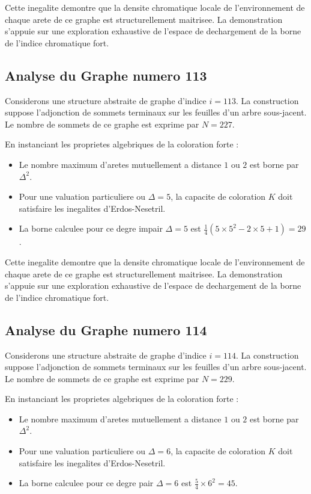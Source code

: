 \documentclass[11pt,a4paper]{article}
\begin{document}
Cette inegalite demontre que la densite chromatique locale de l'environnement de chaque arete de ce graphe est structurellement maitrisee. La demonstration s'appuie sur une exploration exhaustive de l'espace de dechargement de la borne de l'indice chromatique fort.

\subsection{Analyse du Graphe numero 113}
Considerons une structure abstraite de graphe d'indice $i = 113$. La construction suppose l'adjonction de sommets terminaux sur les feuilles d'un arbre sous-jacent. Le nombre de sommets de ce graphe est exprime par $N = 227$.

En instanciant les proprietes algebriques de la coloration forte :
\begin{itemize}
\item Le nombre maximum d'aretes mutuellement a distance $1$ ou $2$ est borne par $\Delta^2$.
\item Pour une valuation particuliere ou $\Delta = 5$, la capacite de coloration $K$ doit satisfaire les inegalites d'Erdos-Nesetril.
\item La borne calculee pour ce degre impair $\Delta = 5$ est $\frac{1}{4}(5 \times 5^2 - 2 \times 5 + 1) = 29$.
\end{itemize}

Cette inegalite demontre que la densite chromatique locale de l'environnement de chaque arete de ce graphe est structurellement maitrisee. La demonstration s'appuie sur une exploration exhaustive de l'espace de dechargement de la borne de l'indice chromatique fort.

\subsection{Analyse du Graphe numero 114}
Considerons une structure abstraite de graphe d'indice $i = 114$. La construction suppose l'adjonction de sommets terminaux sur les feuilles d'un arbre sous-jacent. Le nombre de sommets de ce graphe est exprime par $N = 229$.

En instanciant les proprietes algebriques de la coloration forte :
\begin{itemize}
\item Le nombre maximum d'aretes mutuellement a distance $1$ ou $2$ est borne par $\Delta^2$.
\item Pour une valuation particuliere ou $\Delta = 6$, la capacite de coloration $K$ doit satisfaire les inegalites d'Erdos-Nesetril.
\item La borne calculee pour ce degre pair $\Delta = 6$ est $\frac{5}{4} \times 6^2 = 45$.
\end{itemize}
\end{document}
